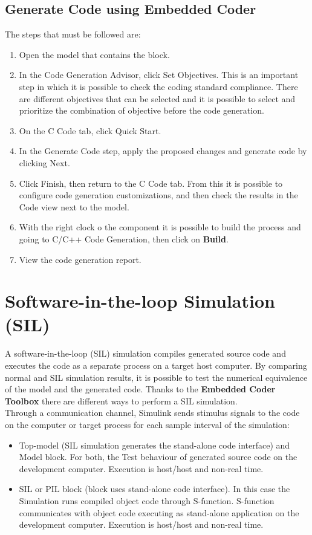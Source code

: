 \documentclass[12pt,a4paper]{report}
\begin{document}
\subsection{Generate Code using Embedded Coder}
The steps that must be followed are:
\begin{enumerate}
	\item Open the model that contains the block. 
	\item In the Code Generation Advisor, click Set Objectives. This is an important step in which it is possible to check the coding standard compliance. There are different objectives that can be selected and it is possible to select and prioritize the combination of objective before the code generation.
	\item On the C Code tab, click Quick Start.
	\item In the Generate Code step, apply the proposed changes and generate code by clicking Next.
	\item Click Finish, then return to the C Code tab. From this it is possible to configure code generation customizations, and then check the results in the Code view next to the model.
	\item With the right clock o the component it is possible to build the process and going to C/C++ Code Generation, then click on \textbf{Build}.
	\item View the code generation report.
\end{enumerate}
\section{Software-in-the-loop Simulation (SIL)}
A software-in-the-loop (SIL) simulation compiles generated source code and executes the code as a separate process on a target host computer. By comparing normal and SIL simulation results, it is possible to test the numerical equivalence of the model and the generated code.
Thanks to the \textbf{Embedded Coder Toolbox} there are different ways to perform a SIL simulation. \\
Through a communication channel, Simulink sends stimulus signals to the code on the computer or target process for each sample interval of the simulation:

\begin{itemize}
	\item Top-model (SIL simulation generates the stand-alone code interface) and Model block. For both, the Test behaviour of generated source code on the development computer. Execution is host/host and non-real time.
	
	\item SIL or PIL block (block uses stand-alone code interface). In this case the Simulation runs compiled object code through S-function. S-function communicates with object code executing as stand-alone application on the development computer. Execution is host/host and non-real time.
\end{itemize}
\end{document}

